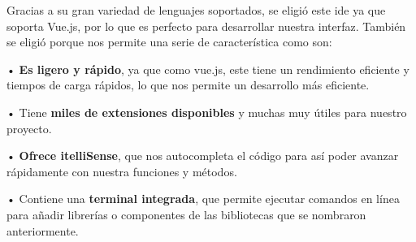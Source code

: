 Gracias a su gran variedad de lenguajes soportados, se eligió este ide ya que soporta Vue.js, por lo que es perfecto para desarrollar nuestra interfaz. También se eligió porque nos permite una serie de característica como son:
	
• \textbf{Es ligero y rápido}, ya que como vue.js, este tiene un rendimiento eficiente y tiempos de carga rápidos, lo que nos permite un desarrollo más eficiente.

• Tiene \textbf{miles de extensiones disponibles} y muchas muy útiles para nuestro proyecto.

• \textbf{Ofrece itelliSense}, que nos autocompleta el código para así poder avanzar rápidamente con nuestra funciones y métodos.

• Contiene una \textbf{terminal integrada}, que permite ejecutar comandos en línea para añadir librerías o componentes de las bibliotecas que se nombraron anteriormente.
